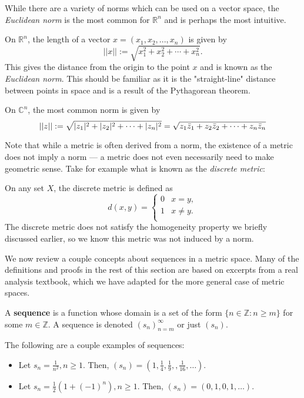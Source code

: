 While there are a variety of norms which can be used on a vector space, the \textit{Euclidean norm} is the most common for $\mathbb{R}^n$ and is perhaps the most intuitive.

\begin{example}
On $\mathbb{R}^n$, the length of a vector $x = (x_1, x_2, ..., x_n)$ is given by
\[||x|| := \sqrt{x_1^2+x_2^2+\cdots+x_n^2}.\]
This gives the distance from the origin to the point $x$ and is known as the \textit{Euclidean norm}.  This should be familiar as it is the "straight-line" distance between points in space and is a result of the Pythagorean theorem.
\end{example}

\begin{example}
On $\mathbb{C}^n$, the most common norm is given by
\[||z|| := \sqrt{|z_1|^2 + |z_2|^2 + \cdots + |z_n|^2} = \sqrt{z_1\bar{z}_1 + z_2\bar{z}_2 + \cdots + z_n\bar{z}_n}\]
\end{example}

Note that while a metric is often derived from a norm, the existence of a metric does not imply a norm --- a metric does not even necessarily need to make geometric sense.  Take for example what is known as the \textit{discrete metric}:

\begin{example}
On any set $X$, the discrete metric is defined as
\[d(x,y)= 
\begin{cases} 
	0 & x=y, \\
	1 & x \neq y.\\
\end{cases}
\]
The discrete metric does not satisfy the homogeneity property we briefly discussed earlier, so we know this metric was not induced by a norm.
\end{example}

We now review a couple concepts about sequences in a metric space.  Many of the definitions and proofs in the rest of this section are based on excerpts from a real analysis textbook\cite{Abbott}, which we have adapted for the more general case of metric spaces.

\begin{defn}
A \textbf{sequence} is a function whose domain is a set of the form $\{n \in \mathbb{Z} : n \geq m\}$ for some $m \in \mathbb{Z}$.  A sequence is denoted $(s_n)_{n=m}^\infty$ or just $(s_n)$.
\end{defn}

\begin{example}
The following are a couple examples of sequences:
\begin{itemize}
\item Let $s_n = \frac{1}{n^2}, n\geq 1$.  Then, $(s_n) = (1, \frac{1}{4}, \frac{1}{9}, , \frac{1}{16}, \dots)$.
\item Let $s_n = \frac{1}{2}(1 + (-1)^n), n \geq 1$.  Then, $(s_n) = (0,1,0,1,\dots)$.
\end{itemize}
\end{example}

